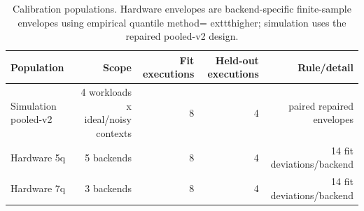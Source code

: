 \begin{table}[t]
\centering
\small
\begin{tabular}{@{}lrrrr@{}}
\toprule
Population & Scope & Fit executions & Held-out executions & Rule/detail \\
\midrule
Simulation pooled-v2 & 4 workloads x ideal/noisy contexts & 8 & 4 & paired repaired envelopes \\
Hardware 5q & 5 backends & 8 & 4 & 14 fit deviations/backend \\
Hardware 7q & 3 backends & 8 & 4 & 14 fit deviations/backend \\
\bottomrule
\end{tabular}
\caption{Calibration populations. Hardware envelopes are backend-specific finite-sample envelopes using empirical quantile method=	exttt{higher}; simulation uses the repaired pooled-v2 design.}
\label{tab:calibration-populations}
\end{table}
